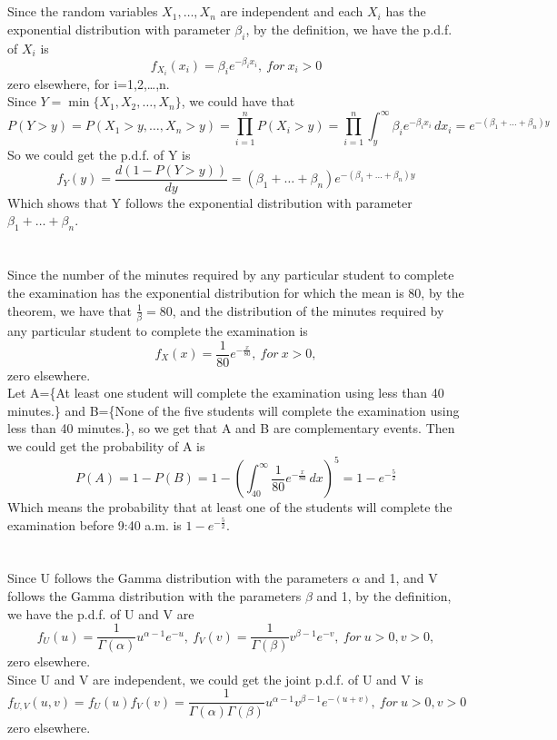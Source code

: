 \documentclass[10.5pt]{article}
\begin{document}
\section{}
Since the random variables $X_1,\dots,X_n$ are independent and each $X_i$ has the exponential distribution with parameter $\beta_i$, by the definition, we have the p.d.f. of $X_i$ is $$f_{X_i}(x_i)=\beta_ie^{-\beta_ix_i},~for ~x_i>0$$\indent
zero elsewhere, for i=1,2,\dots,n.\\\indent
Since $Y=\min\{X_1,X_2,\dots,X_n\}$, we could have that $$P(Y>y)=P(X_1>y,\dots,X_n>y)=\prod_{i=1}^nP(X_i>y)=\prod_{i=1}^{n}\int_y^{\infty}\beta_ie^{-\beta_ix_i}\,dx_i=e^{-(\beta_1+\dots+\beta_n)y}$$\indent
So we could get the p.d.f. of Y is $$f_Y(y)=\frac{d (1-P(Y>y))}{dy}=(\beta_1+\dots+\beta_n)e^{-(\beta_1+\dots+\beta_n)y}$$\indent
Which shows that Y follows the exponential distribution with parameter $\beta_1+\dots+\beta_n$.

\section{}
Since the number of the minutes required by any particular student to complete the examination has the exponential distribution for which the mean is 80, by the theorem, we have that $\frac{1}{\beta}=80$, and the distribution of the minutes required by any particular student to complete the examination is $$f_X(x)=\frac{1}{80}e^{-\frac{x}{80}},~for ~x>0,$$\indent
zero elsewhere.\\\indent
Let A=\{At least one student will complete the examination using less than 40 minutes.\} and B=\{None of the five students will complete the examination using less than 40 minutes.\}, so we get that A and B are complementary events. Then we could get the probability of A is $$P(A)=1-P(B)=1-\left(\int_{40}^{\infty}\frac{1}{80}e^{-\frac{x}{80}}\,dx\right)^5=1-e^{-\frac{5}{2}}$$\indent
Which means the probability that at least one of the students will complete the examination before 9:40 a.m. is $1-e^{-\frac{5}{2}}$.

\section{}
Since U follows the Gamma distribution with the parameters $\alpha$ and 1, and V follows the Gamma distribution with the parameters $\beta$ and 1, by the definition, we have the p.d.f. of U and V are $$f_U(u)=\frac{1}{\Gamma(\alpha)}u^{\alpha-1}e^{-u},~f_V(v)=\frac{1}{\Gamma(\beta)}v^{\beta-1}e^{-v},~for ~u>0,v>0,$$\indent
zero elsewhere.\\\indent
Since U and V are independent, we could get the joint p.d.f. of U and V is $$f_{U,V}(u,v)=f_U(u)f_V(v)=\frac{1}{\Gamma(\alpha)\Gamma(\beta)}u^{\alpha-1}v^{\beta-1}e^{-(u+v)},~for ~u>0,v>0$$\indent
zero elsewhere.
\end{document}

